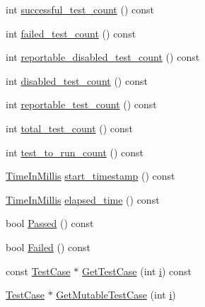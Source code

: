\begin{DoxyCompactItemize}
\item 
int \hyperlink{classtesting_1_1internal_1_1UnitTestImpl_a8beb6a8a95d51790fb081e3a0e9aac34}{successful\+\_\+test\+\_\+count} () const 
\item 
int \hyperlink{classtesting_1_1internal_1_1UnitTestImpl_a9f272a89c64be1801145364cd8753b05}{failed\+\_\+test\+\_\+count} () const 
\item 
int \hyperlink{classtesting_1_1internal_1_1UnitTestImpl_acd5e7483191cf49af70d699e06ea1af1}{reportable\+\_\+disabled\+\_\+test\+\_\+count} () const 
\item 
int \hyperlink{classtesting_1_1internal_1_1UnitTestImpl_ae5239c776abba66170ba84d1c7cee235}{disabled\+\_\+test\+\_\+count} () const 
\item 
int \hyperlink{classtesting_1_1internal_1_1UnitTestImpl_a29df296bc910ce1cf4a088b529e2f396}{reportable\+\_\+test\+\_\+count} () const 
\item 
int \hyperlink{classtesting_1_1internal_1_1UnitTestImpl_a61963ef3fbfe6110170abcb6f4368834}{total\+\_\+test\+\_\+count} () const 
\item 
int \hyperlink{classtesting_1_1internal_1_1UnitTestImpl_aac2aed3bb9f2aa77c43705a9d6dc1849}{test\+\_\+to\+\_\+run\+\_\+count} () const 
\item 
\hyperlink{namespacetesting_1_1internal_a66a845df404b38fe85c5e14a069f255a}{Time\+In\+Millis} \hyperlink{classtesting_1_1internal_1_1UnitTestImpl_acdad9bf7850c7697587b501be5c49f32}{start\+\_\+timestamp} () const 
\item 
\hyperlink{namespacetesting_1_1internal_a66a845df404b38fe85c5e14a069f255a}{Time\+In\+Millis} \hyperlink{classtesting_1_1internal_1_1UnitTestImpl_a0ae726d47c69dd85b4f7858e78368bcb}{elapsed\+\_\+time} () const 
\item 
bool \hyperlink{classtesting_1_1internal_1_1UnitTestImpl_aca57d4b475d7b9ad49f061197124c183}{Passed} () const 
\item 
bool \hyperlink{classtesting_1_1internal_1_1UnitTestImpl_aba1461219cf740bcb2525bd85b504838}{Failed} () const 
\item 
const \hyperlink{classtesting_1_1TestCase}{Test\+Case} $\ast$ \hyperlink{classtesting_1_1internal_1_1UnitTestImpl_a3104213167a38ffa80168a888e769c20}{Get\+Test\+Case} (int \hyperlink{gtest__output__test__golden__lin_8txt_a7e98b8a17c0aad30ba64d47b74e2a6c1}{i}) const 
\item 
\hyperlink{classtesting_1_1TestCase}{Test\+Case} $\ast$ \hyperlink{classtesting_1_1internal_1_1UnitTestImpl_a2ca71a08060037357fc7e1a406b89add}{Get\+Mutable\+Test\+Case} (int \hyperlink{gtest__output__test__golden__lin_8txt_a7e98b8a17c0aad30ba64d47b74e2a6c1}{i})

\end{DoxyCompactItemize}
